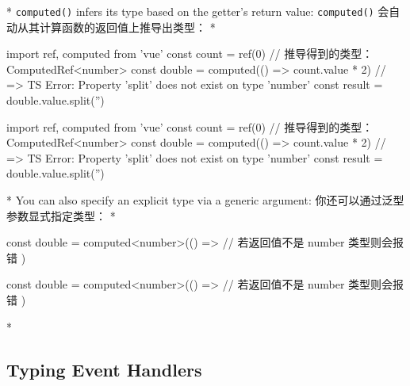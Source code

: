 \begin{paracol}{2} 
 
\switchcolumn[0]*%
\texttt{computed()} infers its type based on the getter's return value:
\switchcolumn
\texttt{computed()} 会自动从其计算函数的返回值上推导出类型：
\switchcolumn[0]*%
\begin{codeTs}
import { ref, computed } from 'vue'
const count = ref(0)
// 推导得到的类型：ComputedRef<number>
const double = computed(() => count.value * 2)
// => TS Error: Property 'split' does not exist on type 'number'
const result = double.value.split('')
\end{codeTs}
\switchcolumn
\begin{codeTs}
import { ref, computed } from 'vue'
const count = ref(0)
// 推导得到的类型：ComputedRef<number>
const double = computed(() => count.value * 2)
// => TS Error: Property 'split' does not exist on type 'number'
const result = double.value.split('')
\end{codeTs}
\switchcolumn[0]*%
You can also specify an explicit type via a generic argument:
\switchcolumn
你还可以通过泛型参数显式指定类型：
\switchcolumn[0]*%
\begin{codeTs}
const double = computed<number>(() => {
  // 若返回值不是 number 类型则会报错
})
\end{codeTs}
\switchcolumn
\begin{codeTs}
const double = computed<number>(() => {
  // 若返回值不是 number 类型则会报错
})
\end{codeTs}
\switchcolumn[0]*%
\subsection{Typing Event Handlers}
\switchcolumn

\end{paracol}
